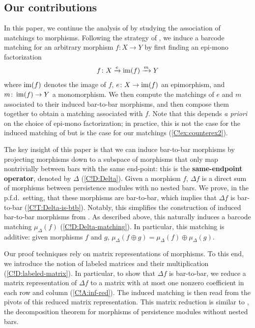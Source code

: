 \subsection{Our contributions}

In this paper, we continue the analysis of \cite{AGRS2025} by studying the association of matchings to morphisms. Following the strategy of \cite{BauerLesnick2015}, we induce a barcode matching for an arbitrary morphism $f \colon X \to Y$ by first finding an epi-mono factorization
\[
  f \colon X \xrightarrow{e} \operatorname{im}(f) \xrightarrow{m} Y
\]
where $\operatorname{im}(f)$ denotes the image of $f$, $e \colon X \to \operatorname{im}(f)$ an epimorphism, and $m \colon \operatorname{im}(f) \to Y$ a monomorphism. We then compute the matchings of $e$ and $m$ associated to their induced bar-to-bar morphisms, and then compose them together to obtain a matching associated with $f$. Note that this depends \textit{a priori} on the choice of epi-mono factorization; in practice, this is not the case for the induced matching of \cite{BauerLesnick2015} but is the case for our matchings (\cref{C!ex:counterex2}).

The key insight of this paper is that we can induce bar-to-bar morphisms by projecting morphisms down to a subspace of morphisms that only map nontrivially between bars with the same end-point: this is the \textbf{same-endpoint operator}, denoted by $\Delta$ (\cref{C!D:Delta}). Given a morphism $f$, $\Delta f$ is a direct sum of morphisms between persistence modules with no nested bars. We prove, in the p.f.d.\ setting, that these morphisms are bar-to-bar, which implies that $\Delta f$ is bar-to-bar (\cref{C!T:Delta-is-btb}). Notably, this simplifies the construction of induced bar-to-bar morphisms from \cite{AGRS2025}. As described above, this naturally induces a barcode matching $\mu_\Delta(f)$ (\cref{C!D:Delta-matching}). In particular, this matching is additive: given morphisms $f$ and $g$, $\mu_\Delta(f \oplus g) = \mu_\Delta(f) \oplus \mu_\Delta(g)$.

Our proof techniques rely on matrix representations of morphisms. To this end, we introduce the notion of labeled matrices and their multiplication (\cref{C!D:labeled-matrix}). In particular, to show that $\Delta f$ is bar-to-bar, we reduce a matrix representation of $\Delta f$ to a matrix with at most one nonzero coefficient in each row and column (\cref{C!A:inf-red}). The induced matching is then read from the pivots of this reduced matrix representation. This matrix reduction is similar to \cite[Theorem 5.3]{JNT2023}, the decomposition theorem for morphisms of persistence modules without nested bars.

